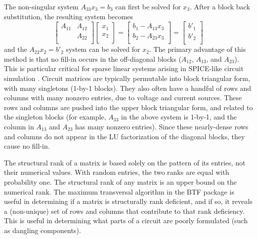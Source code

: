 \documentclass[11pt]{article}
\begin{document}
The non-singular system $A_{33} x_{3} = b_{3}$ can first be solved for $x_{3}$.
After a block back substitution, the resulting system becomes
\[
\left[
\begin{array}{cc}
A_{11} & A_{12} \\
       & A_{22} \\
\end{array}
\right]
\left[
\begin{array}{c}
x_{1} \\
x_{2} \\
\end{array}
\right]
=
\left[
\begin{array}{c}
b_{1} - A_{13} x_{3}\\
b_{2} - A_{23} x_{3}\\
\end{array}
\right]
=
\left[
\begin{array}{c}
b'_{1} \\
b'_{2} \\
\end{array}
\right]
\]
and the $A_{22} x_{2} = b'_{2}$ system can be solved for $x_{2}$.  The primary
advantage of this method is that no fill-in occurs in the off-diagonal blocks
($A_{12}$, $A_{13}$, and $A_{23}$).  This is particular critical for sparse
linear systems arising in SPICE-like circuit simulation
\cite{Kundert86,KundertSangiovanniVincentelli85,NagelPederson,Quarles:M89/42}.
Circuit matrices are typically permutable into block triangular form, with many
singletons (1-by-1 blocks).  They also often have a handful of rows and columns
with many nonzero entries, due to voltage and current sources.  These rows and
columns are pushed into the upper block triangular form, and related to the
singleton blocks (for example, $A_{33}$ in the above system is 1-by-1, and the
column in $A_{13}$ and $A_{23}$ has many nonzero entries).  Since these
nearly-dense rows and columns do not appear in the LU factorization of the
diagonal blocks, they cause no fill-in.

The structural rank of a matrix is based solely on the pattern of its entries,
not their numerical values.  With random entries, the two ranks are equal with
probability one.   The structural rank of any matrix is an upper bound on the
numerical rank.  The maximum transversal algorithm in the BTF package is useful
in determining if a matrix is structurally rank deficient, and if so, it
reveals a (non-unique) set of rows and columns that contribute to that rank
deficiency.  This is useful in determining what parts of a circuit are poorly
formulated (such as dangling components).
\end{document}
